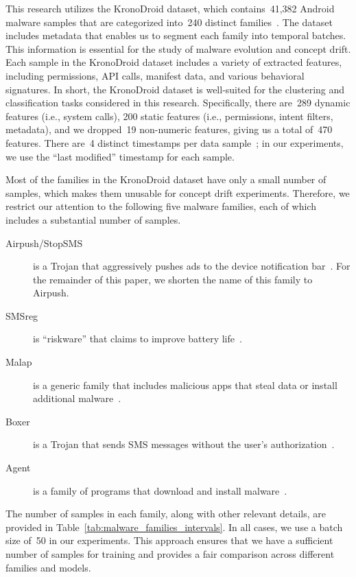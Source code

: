 \documentclass[12pt]{article}
\begin{document}
This research utilizes the KronoDroid dataset, which contains~41,382 Android malware samples
that are categorized into~240 distinct families~\cite{Krono}. The dataset includes metadata that enables 
us to segment each family into temporal batches. This information is essential for the study 
of malware evolution and concept drift. Each sample in the KronoDroid dataset includes a variety
of extracted features, including permissions, API calls, manifest data, and various behavioral signatures.
In short, the KronoDroid dataset is well-suited for the clustering and classification tasks considered in
this research. Specifically, there are~289 dynamic features (i.e., system calls),
200 static features (i.e., permissions, intent filters, metadata),
and we dropped~19 non-numeric features, giving us a total of~470 features.
There are~4 distinct timestamps per data sample~\cite{github};
in our experiments, we use the ``last modified'' timestamp for each sample.

Most of the families in the KronoDroid dataset have only a small number of samples, which makes them
unusable for concept drift experiments. Therefore, we restrict our attention to the following
five malware families, each of which includes a substantial number of samples.
\begin{description}
\item[Airpush/StopSMS] is a Trojan that aggressively pushes ads to the device notification bar~\cite{AirPush}.
For the remainder of this paper, we shorten the name of this family to Airpush.
\item[SMSreg] is ``riskware'' that claims to improve battery life~\cite{SMSReg}.
\item[Malap] is a generic family that includes malicious apps that steal data or install additional malware~\cite{Alejandro}.
\item[Boxer] is a Trojan that sends SMS messages without the user's authorization~\cite{Boxer}.
\item[Agent] is a family of programs that download and install malware~\cite{Agent}.
\end{description}

The number of samples in each family, along with
other relevant details, are provided in Table~\ref{tab:malware_families_intervals}.
In all cases, we use a batch size of~50 in our experiments. 
This approach ensures that we have a sufficient number of 
samples for training and provides a fair comparison 
across different families and models. 
\end{document}

